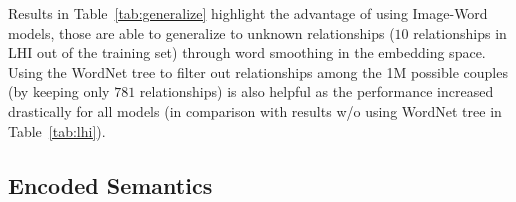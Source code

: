 \begin{table}[t!]
\begin{center}

\caption{\textbf{WordNet Tree and Unseen relationships}\label{tab:generalize}
Image-Word Shared models allow to generalize to unseen relationships. Using the
WordNet tree also improves the performance. (IO) refers to the original Image
where an offset was added to filter out relations both in the
WordNet tree and the training set. Part-Object relationships are ranked among $781$ couples.}

\end{center}
\end{table}


Results in Table~\ref{tab:generalize} highlight the advantage of using
Image-Word models, those are able to generalize to unknown relationships ($10$
relationships in LHI out of the training set) through word smoothing in the
embedding space.  Using the WordNet tree to filter out relationships among the
1M possible couples (by keeping only $781$ relationships) is also helpful as
the performance increased drastically for all models (in comparison with
results w/o using WordNet tree in Table~\ref{tab:lhi}).

\subsection{Encoded Semantics}

